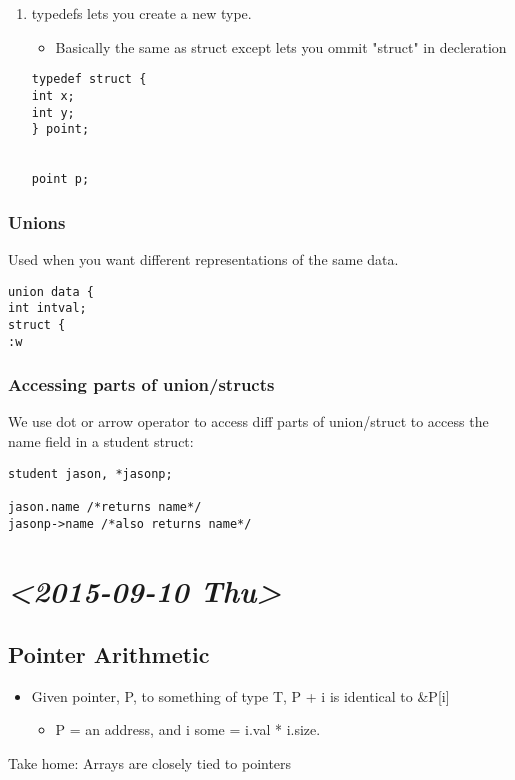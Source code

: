 \documentclass[11pt]{article}
\begin{document}
\begin{enumerate}
\item typedefs
\label{sec-2-8-2-1}
lets you create a new type.
\begin{itemize}
\item Basically the same as struct except lets you ommit "struct" in decleration
\end{itemize}
\begin{verbatim}
typedef struct {
int x;
int y;
} point;


point p;
\end{verbatim}
\end{enumerate}

\subsubsection{\textbf{Unions}}
\label{sec-2-8-3}
Used when you want different representations of the same data.
\begin{verbatim}
union data {
int intval;
struct {
:w
\end{verbatim}
\subsubsection{Accessing parts of union/structs}
\label{sec-2-8-4}
We use dot or arrow operator to access diff parts of union/struct
to access the name field in a student struct:
\begin{verbatim}
student jason, *jasonp;

jason.name /*returns name*/
jasonp->name /*also returns name*/
\end{verbatim}
\section{\textit{<2015-09-10 Thu>}}
\label{sec-3}
\subsection{Pointer Arithmetic}
\label{sec-3-1}
\begin{itemize}
\item Given pointer, P, to something of type T, P + i is identical to \&P[i]
\begin{itemize}
\item P = an address, and i some = i.val * i.size.
\end{itemize}
\end{itemize}

Take home: Arrays are closely tied to pointers
\end{document}
